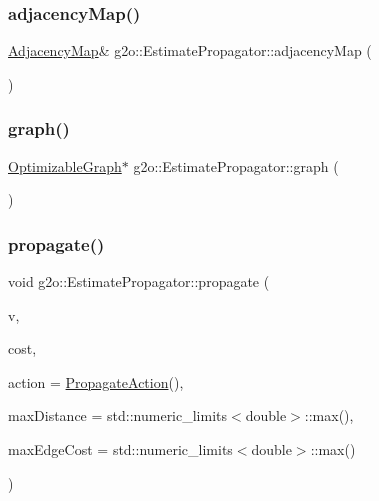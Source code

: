 \subsubsection{\texorpdfstring{adjacency\+Map()}{adjacencyMap()}}
{\footnotesize\ttfamily \mbox{\hyperlink{classg2o_1_1_estimate_propagator_aa450038ec206c089ecf023cb88cb2847}{Adjacency\+Map}}\& g2o\+::\+Estimate\+Propagator\+::adjacency\+Map (\begin{DoxyParamCaption}{ }\end{DoxyParamCaption})\hspace{0.3cm}{\ttfamily [inline]}}

\mbox{\label{classg2o_1_1_estimate_propagator_a97064a86789b496b590f4848fdb59bc8}} 
\subsubsection{\texorpdfstring{graph()}{graph()}}
{\footnotesize\ttfamily \mbox{\hyperlink{structg2o_1_1_optimizable_graph}{Optimizable\+Graph}}$\ast$ g2o\+::\+Estimate\+Propagator\+::graph (\begin{DoxyParamCaption}{ }\end{DoxyParamCaption})\hspace{0.3cm}{\ttfamily [inline]}}

\mbox{\label{classg2o_1_1_estimate_propagator_a3b1df65f9b89d81dff33cb140d4f75d4}} 
\subsubsection{\texorpdfstring{propagate()}{propagate()}\hspace{0.1cm}{\footnotesize\ttfamily [1/2]}}
{\footnotesize\ttfamily void g2o\+::\+Estimate\+Propagator\+::propagate (\begin{DoxyParamCaption}\item[{\mbox{\hyperlink{classg2o_1_1_optimizable_graph_1_1_vertex}{Optimizable\+Graph\+::\+Vertex}} $\ast$}]{v,  }\item[{const \mbox{\hyperlink{classg2o_1_1_estimate_propagator_a67a42f9c6d5f92562ac4ea12f81c8d9c}{Estimate\+Propagator\+::\+Propagate\+Cost}} \&}]{cost,  }\item[{const \mbox{\hyperlink{structg2o_1_1_estimate_propagator_1_1_propagate_action}{Estimate\+Propagator\+::\+Propagate\+Action}} \&}]{action = {\ttfamily \mbox{\hyperlink{structg2o_1_1_estimate_propagator_1_1_propagate_action}{Propagate\+Action}}()},  }\item[{double}]{max\+Distance = {\ttfamily std\+:\+:numeric\+\_\+limits$<$double$>$\+:\+:max()},  }\item[{double}]{max\+Edge\+Cost = {\ttfamily std\+:\+:numeric\+\_\+limits$<$double$>$\+:\+:max()} }\end{DoxyParamCaption})}

